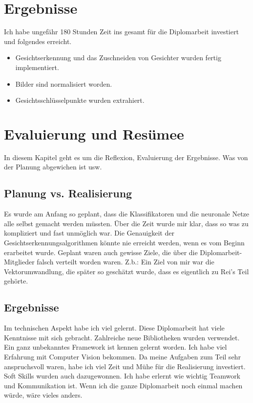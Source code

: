 \section{Ergebnisse}

	
Ich habe ungefähr 180 Stunden Zeit ins gesamt für die Diplomarbeit investiert und folgendes erreicht.\\

\begin{itemize}
	\item Gesichtserkennung und das Zuschneiden von Gesichter wurden fertig
	implementiert.
	\item Bilder sind normalisiert worden.\\
	\item Gesichtsschlüsselpunkte wurden extrahiert.\\
	
\end{itemize}


\section{Evaluierung und Resümee}

	In diesem Kapitel geht es um die Reflexion, Evaluierung der Ergebnisse. Was von der Planung abgewichen ist usw. 

\subsection{Planung vs. Realisierung}


Es wurde am Anfang so geplant, dass die Klassifikatoren und die neuronale Netze alle selbst gemacht werden müssten. 
Über die Zeit wurde mir klar, dass so was zu kompliziert und fast unmöglich war.
Die Genauigkeit der Gesichtserkennungsalgorithmen könnte nie erreicht werden, wenn es vom Beginn erarbeitet wurde. Geplant waren auch gewisse Ziele, die über die Diplomarbeit-Mitglieder falsch verteilt worden waren. Z.b.: Ein Ziel von mir war die Vektorumwandlung, die später so geschätzt wurde, dass es eigentlich zu Rei's Teil gehörte. 
	
	

\subsection{Ergebnisse}

	Im technischen Aspekt habe ich viel gelernt.
	Diese Diplomarbeit hat viele Kenntnisse mit sich gebracht. Zahlreiche neue Bibliotheken wurden verwendet. 
	Ein ganz unbekanntes Framework ist kennen gelernt worden. 
	Ich habe viel Erfahrung mit Computer Vision bekommen.
	Da meine Aufgaben zum Teil sehr anspruchsvoll waren, habe ich viel Zeit und Mühe für die Realisierung investiert.
	Soft Skills wurden auch dazugewonnen. Ich habe erlernt wie wichtig Teamwork und Kommunikation ist. 
	Wenn ich die ganze Diplomarbeit noch einmal machen würde, wäre vieles anders. 
	  

